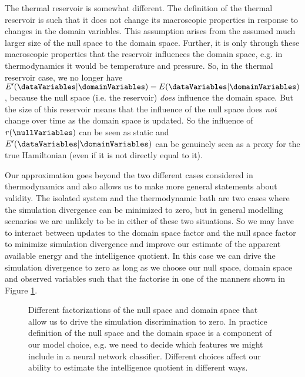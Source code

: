 The thermal reservoir is somewhat different. The definition of the thermal reservoir is such that it does not change its macroscopic properties in response to changes in the domain variables. This assumption arises from the assumed much larger size of the null space to the domain space. Further, it is only through these macroscopic properties that the reservoir influences the domain space, e.g. in thermodynamics it would be temperature and pressure. So, in the thermal reservoir case, we no longer have $E^\prime(\dataVariables |\domainVariables) = E(\dataVariables |\domainVariables)$, because the null space (i.e. the reservoir) \emph{does} influence the domain space. But the size of this reservoir means that the influence of the null space does \emph{not} change over time as the domain space is updated. So the influence of $r(\nullVariables)$ can be seen as static  and $E^\prime(\dataVariables |\domainVariables)$ can be genuinely seen as a proxy for the true Hamiltonian (even if it is not directly equal to it).  

Our approximation goes beyond the two different cases considered in thermodynamics and also allows us to make more general statements about validity. The isolated system and the thermodynamic bath are two cases where the simulation divergence can be minimized to zero, but in general modelling scenarios we are unlikely to be in either of these two situations. So we may have to interact between updates to the domain space factor and the null space factor to minimize simulation divergence and improve our estimate of the apparent available energy and the intelligence quotient. In this case we can drive the simulation divergence to zero as long as we choose our null space, domain space and observed variables such that the factorise in one of the manners shown in Figure \ref{fig-null-space-factorisation}.

\begin{figure}
    \centering
    \caption{Different factorizations of the null space and domain space that allow us to drive the simulation discrimination to zero. In practice definition of the null space and the domain space is a component of our model choice, e.g. we need to decide which features we might include in a neural network classifier. Different choices affect our ability to estimate the intelligence quotient in different ways.}
    \label{fig-null-space-factorisation}
\end{figure}

